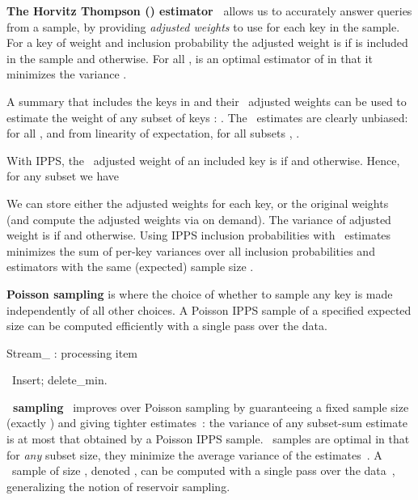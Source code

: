 \documentclass[11pt]{article}
\begin{document}

\medskip
\noindent
{\bf The Horvitz Thompson (\HT) estimator~\cite{HT52}} 
allows us to accurately answer queries from a sample, by 
providing {\em adjusted weights} to use for each key in the sample. 
For a key  of weight  and inclusion probability  the 
adjusted weight is  if  is included in
the sample and  otherwise.  
For all ,  is an optimal estimator of  in that it minimizes 
the variance .  

 A summary that includes the keys in  and 
their \HT\ adjusted weights can be used to 
estimate the weight  of any subset of keys : 
 .
 The \HT\ estimates are clearly
unbiased: for all ,  and from linearity of expectation,
for all subsets , .  

With IPPS, the \HT\ adjusted weight of an included key
is  if  and  otherwise.  
Hence, for any subset  we have

We can store either the adjusted weights for
each key, or the original weights (and compute the adjusted weights
via  on demand). 
The variance of adjusted weight  
is  
if  and  otherwise. 
Using IPPS inclusion probabilities with \HT\ estimates
minimizes the sum  of per-key variances 
over all inclusion probabilities and estimators with
the same (expected) sample size .

\medskip
\noindent
{\bf Poisson sampling} is where
the choice of whether to sample any key is made independently of all
other choices.
A Poisson IPPS sample of a specified expected size  can be
 computed efficiently with a single pass over the data.


\begin{algorithm}[t]
\caption{{\sc Stream\_} : processing item }\label{get_tau_k:alg}
\begin{algorithmic}[1]
\If {} 
\Else \, Insert;
\EndIf
{} \label{linewhile}
\State  delete\_min.
\State 
\State  \label{line_get_tau}
\EndWhile
\end{algorithmic}
\end{algorithm}

\medskip
\noindent
{\bf \varopt\ sampling}~\cite{Cha82,Tille:book,varopt:CDKLT08}
 improves over Poisson sampling by guaranteeing a fixed
sample size (exactly ) and giving tighter
estimates~\cite{varopt:CDKLT08,varopt_full:CDKLT10,Cha82,Tille:book,GandhiKPS:jacm06}: 
the variance of any subset-sum
 estimate is at most that obtained by a Poisson IPPS sample.
\varopt\ samples are optimal in that 
for {\em any} subset size, they minimize the 
average variance of the estimates~\cite{ST07,varopt:CDKLT08}.
A \varopt\ sample of size , denoted \varopt, 
can be computed with a single pass over the
data~\cite{varopt_full:CDKLT10}, 
generalizing the notion of reservoir sampling. 
\end{document}
